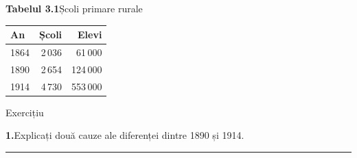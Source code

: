 \documentclass[10pt]{article}
\begin{document}
\vspace{4pt}
\begin{minipage}[t]{0.5\linewidth}\small
{\sffamily\footnotesize\color{accent}\textbf{Tabelul 3.1}\enspace\color{muted}Școli primare rurale}\par\vspace{2pt}

\begin{tabular}{@{}lrr@{}}\toprule
\sffamily An & \sffamily Școli & \sffamily Elevi\\\midrule
1864 & 2\,036 & 61\,000\\ 1890 & 2\,654 & 124\,000\\ 1914 & 4\,730 & 553\,000\\\bottomrule
\end{tabular}\end{minipage}\hfill
\begin{minipage}[t]{0.45\linewidth}\small
{\sffamily\footnotesize\color{muted}Exercițiu}\par\vspace{2pt}
{\sffamily\bfseries\color{accent}1.}\enspace Explicați două cauze ale diferenței dintre 1890 și 1914.\par\vspace{3pt}
{\color{rule}\rule{\linewidth}{0.4pt}}\par\vspace{9pt}{\color{rule}\rule{\linewidth}{0.4pt}}\par\vspace{9pt}{\color{rule}\rule{\linewidth}{0.4pt}}
\end{minipage}
\end{document}
